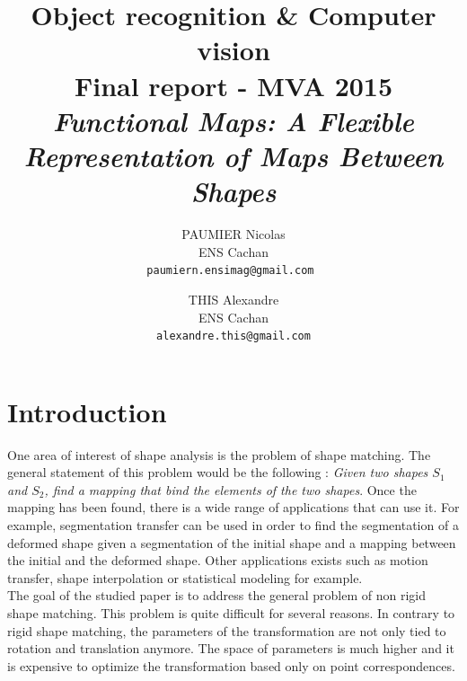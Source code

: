 \documentclass[10pt,twocolumn,letterpaper]{article}
\begin{document}
\title{Object recognition \& Computer vision \\ Final report - MVA 2015 \\ \textit{Functional Maps: A Flexible Representation of Maps Between Shapes}}

\author{PAUMIER Nicolas\\
ENS Cachan\\
{\tt\small paumiern.ensimag@gmail.com }
\and
THIS Alexandre\\
ENS Cachan\\
{\tt\small alexandre.this@gmail.com}
}

\maketitle

\begin{abstract} %
\end{abstract}


\section{Introduction} %
One area of interest of shape analysis is the problem of shape matching. The general statement of this problem would be the following : \textit{Given two shapes $S_{1}$ and $S_{2}$, find a mapping that bind the elements of the two shapes}. Once the mapping has been found, there is a wide range of applications that can use it. For example, segmentation transfer can be used in order to find the segmentation of a deformed shape given a segmentation of the initial shape and a mapping between the initial and the deformed shape. Other applications exists such as motion transfer, shape interpolation or statistical modeling for example.\\

The goal of the studied paper is to address the general problem of non rigid shape matching. This problem is quite difficult for several reasons. In contrary to rigid shape matching, the parameters of the transformation are not only tied to rotation and translation anymore. The space of parameters is much higher and it is expensive to optimize the transformation based only on point correspondences. \\
\end{document}
